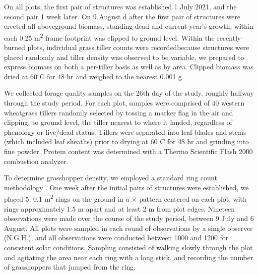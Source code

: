 \documentclass[referee, 
	            sn-basic]
           {sn-jnl}
\begin{document}
\begin{linenumbers}
On all plots, the first pair of structures was established 1 July 2021, and the second pair 1 week later. 
On 9 August d after the first pair of structures were erected\textemdash 
all aboveground biomass, standing dead and current year's growth, within each 0.25 m\textsuperscript{2} frame footprint was clipped to ground level.
Within the recently-burned plots, individual grass tiller counts were recorded\textemdash because structures were placed randomly and tiller density was observed to be variable, we prepared to express biomass on both a per-tiller basis as well as by area. 
Clipped biomass was dried at 60$^\circ$C for 48 hr and weighed to the nearest 0.001 g. 


We collected forage quality samples on the 26th day of the study, roughly halfway through the study period.
For each plot, samples were comprised of 40 western wheatgrass tillers randomly selected by tossing a marker flag in the air and clipping, to ground level, the tiller nearest to where it landed, regardless of phenology or live/dead status. 
Tillers were  separated into leaf blades and stems (which included leaf sheaths) prior to drying at 60$^\circ$C for 48 hr and grinding into fine powder. 
Protein content was determined with a Thermo Scientific Flash 2000 combustion analyzer. 

To determine grasshopper density, we employed a standard ring count methodology
\citep{onsager1977, joern2013}. 
One week after the initial pairs of structures were established, we placed 5, 0.1 m\textsuperscript{2} rings on the ground in a {\large{$\times$}} pattern centered on each plot, with rings approximately 1.5 m apart and at least 2 m from plot edges.
Nineteen observations were made over the course of the study period, between 9 July and 6 August. 
All plots were sampled in each round of observations by a single observer (N.G.H.), and all observations were conducted between 1000 and 1200 for consistent solar conditions. 
Sampling consisted of walking slowly through the plot and agitating the area near each ring with a long stick, and recording the number of grasshoppers that jumped from the ring.


\end{linenumbers}
\end{document}
